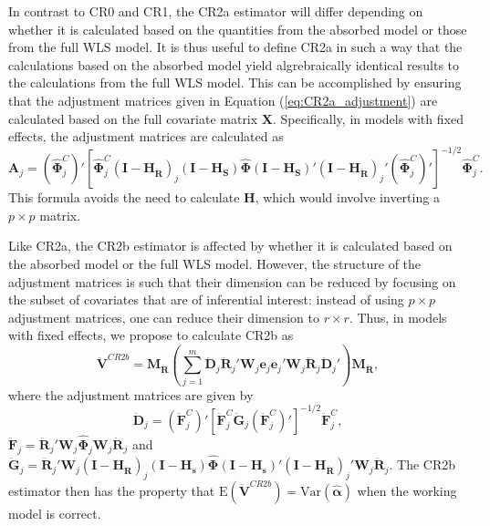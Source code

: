 \documentclass[12pt]{article}\usepackage[]{graphicx}\usepackage[]{color}
\newcommand{\E}{\text{E}}
\newcommand{\Var}{\text{Var}}
\newcommand{\bm}{\mathbf}
\newcommand{\bs}{\boldsymbol}
\begin{document}
In contrast to CR0 and CR1, the CR2a estimator will differ depending on whether it is calculated based on the quantities from the absorbed model or those from the full WLS model. 
It is thus useful to define CR2a in such a way that the calculations based on the absorbed model yield algrebraically identical results to the calculations from the full WLS model. 
This can be accomplished by ensuring that the adjustment matrices given in Equation (\ref{eq:CR2a_adjustment}) are calculated based on the full covariate matrix $\bm{X}$. Specifically, in models with fixed effects, the adjustment matrices are calculated as \[
\bm{A}_j = \left(\hat{\bs\Phi}_j^C\right)' \left[\hat{\bs\Phi}_j^C\left(\bm{I} - \bm{H_{\ddot{R}}}\right)_j \left(\bm{I} - \bm{H_S}\right) \hat{\bs\Phi} \left(\bm{I} - \bm{H_S}\right)' \left(\bm{I} - \bm{H_{\ddot{R}}}\right)_j' \left(\hat{\bs\Phi}_j^C\right)' \right]^{-1/2}\hat{\bs\Phi}_j^C.
\]
This formula avoids the need to calculate $\bm{H}$, which would involve inverting a $p \times p$ matrix.

Like CR2a, the CR2b estimator is affected by whether it is calculated based on the absorbed model or the full WLS model. However, the structure of the adjustment matrices is such that their dimension can be reduced by focusing on the subset of covariates that are of inferential interest: instead of using $p \times p$ adjustment matrices, one can reduce their dimension to $r \times r$. Thus, in models with fixed effects, we propose to calculate CR2b as 
\begin{equation}
\label{eq:V_CR2b_FE}
\bm{\ddot{V}}^{CR2b} = \bm{M_{\ddot{R}}} \left(\sum_{j=1}^m \bm{\ddot{D}}_j \bm{\ddot{R}}_j' \bm{W}_j \bm{e}_j \bm{e}_j' \bm{W}_j \bm{\ddot{R}}_j \bm{\ddot{D}}_j'\right) \bm{M_{\ddot{R}}},
\end{equation}
where the adjustment matrices are given by 
\begin{equation}
\bm{\ddot{D}}_j = \left(\bm{\ddot{F}}_j^C\right)'\left[\bm{\ddot{F}}_j^C \bm{\ddot{G}}_j \left(\bm{\ddot{F}}_j^C\right)'\right]^{-1/2}\bm{\ddot{F}}_j^C,
\end{equation}
$\bm{\ddot{F}}_j = \bm{\ddot{R}}_j' \bm{W}_j \hat{\bs\Phi}_j \bm{W}_j \bm{\ddot{R}}_j$ and $\bm{\ddot{G}}_j = \bm{\ddot{R}}_j' \bm{W}_j \left(\bm{I} - \bm{H_{\ddot{R}}}\right)_j  \left(\bm{I} - \bm{H_s}\right) \hat{\bs\Phi} \left(\bm{I} - \bm{H_s}\right)' \left(\bm{I} - \bm{H_{\ddot{R}}}\right)_j' \bm{W}_j \bm{\ddot{R}}_j$. The CR2b estimator then has the property that $\E\left(\bm{\ddot{V}}^{CR2b}\right) = \Var\left(\bs{\hat\alpha}\right)$ when the working model is correct.
\end{document}
